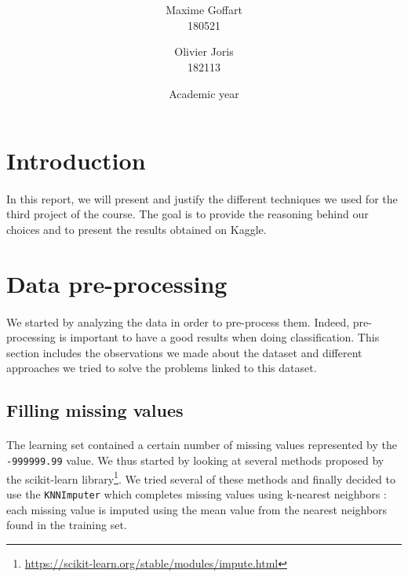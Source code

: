 \documentclass[a4paper, 11pt, oneside]{article}
\title{\ClassName\\\vspace*{0.8cm}\ProjectName\vspace{1cm}}
\author{Maxime Goffart \\180521 \and Olivier Joris\\182113}
\date{\vspace{1cm}Academic year \AcademicYear}
\begin{document}
\begin{titlingpage}
{\let\newpage\relax\maketitle}
\end{titlingpage}

\thispagestyle{empty}
\newpage


\tableofcontents
\newpage


\section{Introduction}
\paragraph{}In this report, we will present and justify the different techniques we used for the third project of the course. The goal is to provide the reasoning behind our choices and to present the results obtained on Kaggle.

\section{Data pre-processing}
\paragraph{}We started by analyzing the data in order to pre-process them. Indeed, pre-processing is important
to have a good results when doing classification. This section includes the observations we made about the dataset
and different approaches we tried to solve the problems linked to this dataset.

\subsection{Filling missing values}
\paragraph{}The learning set contained a certain number of missing values represented by the \texttt{-999999.99} value. We thus started by looking at several 
methods proposed by the scikit-learn library\footnote{\url{https://scikit-learn.org/stable/modules/impute.html}}. We tried several of these methods and finally decided to use the \texttt{KNNImputer} which completes missing values using k-nearest neighbors : each missing value is imputed using the mean value from the nearest neighbors found in the training set. 
\end{document}
